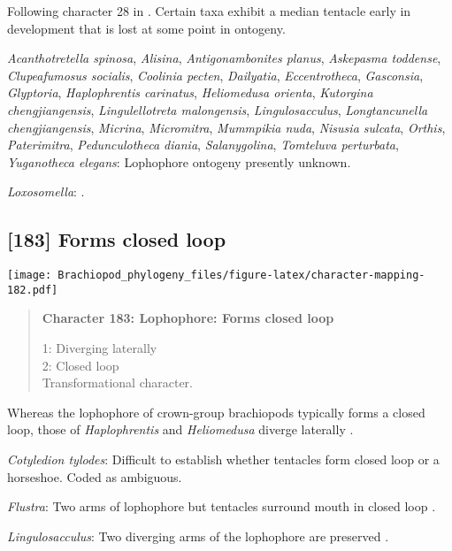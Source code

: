 \documentclass[openany]{book}
\theoremstyle{definition}
\theoremstyle{definition}
\theoremstyle{definition}
\theoremstyle{remark}
\begin{document}
Following character 28 in \citet{Carlson1995Phylogeneticrelationships}.
Certain taxa exhibit a median tentacle early in development that is lost
at some point in ontogeny.

\hypertarget{Acanthotretella_spinosa-coding-182}{}
\emph{Acanthotretella spinosa}, \emph{Alisina}, \emph{Antigonambonites
planus}, \emph{Askepasma toddense}, \emph{Clupeafumosus socialis},
\emph{Coolinia pecten}, \emph{Dailyatia}, \emph{Eccentrotheca},
\emph{Gasconsia}, \emph{Glyptoria}, \emph{Haplophrentis carinatus},
\emph{Heliomedusa orienta}, \emph{Kutorgina chengjiangensis},
\emph{Lingulellotreta malongensis}, \emph{Lingulosacculus},
\emph{Longtancunella chengjiangensis}, \emph{Micrina},
\emph{Micromitra}, \emph{Mummpikia nuda}, \emph{Nisusia sulcata},
\emph{Orthis}, \emph{Paterimitra}, \emph{Pedunculotheca diania},
\emph{Salanygolina}, \emph{Tomteluva perturbata}, \emph{Yuganotheca
elegans}: Lophophore ontogeny presently unknown.

\hypertarget{Loxosomella-coding-182}{}
\emph{Loxosomella}: \citet{Nielsen1966}.

\subsection*{{[}183{]} Forms closed loop}\label{forms-closed-loop}

\texttt{[image: Brachiopod\_phylogeny\_files/figure-latex/character-mapping-182.pdf]}

\begin{quote}
\textbf{Character 183: Lophophore: Forms closed loop}

1: Diverging laterally\\
2: Closed loop\\
Transformational character.
\end{quote}

Whereas the lophophore of crown-group brachiopods typically forms a
closed loop, those of \emph{Haplophrentis} and \emph{Heliomedusa}
diverge laterally \citep{Moysiuk2017Hyolithsare}.

\hypertarget{Cotyledion_tylodes-coding-183}{}
\emph{Cotyledion tylodes}: Difficult to establish whether tentacles form
closed loop or a horseshoe. Coded as ambiguous.

\hypertarget{Flustra-coding-183}{}
\emph{Flustra}: Two arms of lophophore but tentacles surround mouth in
closed loop \citep{Schwaha2015}.

\hypertarget{Lingulosacculus-coding-183}{}
\emph{Lingulosacculus}: Two diverging arms of the lophophore are
preserved \citep{Balthasar2009EarlyCambrian}.
\end{document}
